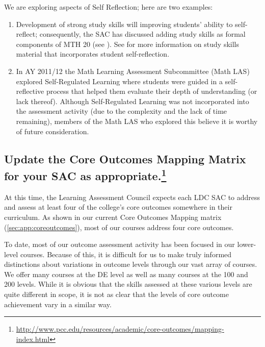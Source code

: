 \begin{description}
	We are exploring aspects of Self Reflection; here are two examples:
	\begin{enumerate}
		\item
		Development of strong study skills will improving students' ability to self-reflect; consequently,
		the SAC has discussed adding study skills as formal components
		of MTH 20 (see ).  See 
		for more information on study skills material that incorporates student
		self-reflection.
		\item
		In AY 2011/12 the Math Learning Assessment Subcommittee (Math LAS) explored
		Self-Regulated Learning where students were guided in a self-reflective
		process that helped them evaluate their depth of understanding (or lack
		thereof).  Although Self-Regulated Learning was not incorporated into the
		assessment activity (due to the complexity and the lack of time remaining),
		members of the Math LAS who explored this believe it is worthy of future
		consideration.
	\end{enumerate}
\end{description}

\subsection[Core outcomes mapping matrix]{Update the Core Outcomes Mapping Matrix for your SAC as
appropriate.\footnote{\url{http://www.pcc.edu/resources/academic/core-outcomes/mapping-index.html}}}
At this time, the Learning Assessment Council expects each LDC SAC to address and assess at least four of the college's core outcomes somewhere in their curriculum. As shown in our current Core Outcomes Mapping matrix (\vref{sec:app:coreoutcomes}), most of our courses address four core outcomes.  

To date, most of our outcome assessment activity has been focused in our
lower-level courses. Because of this, it is difficult for us to make truly
informed distinctions about variations in outcome levels through our vast array
of courses.  We offer many courses at the DE level as well as many courses at
the 100 and 200 levels.  While it is obvious that the skills assessed at these
various levels are quite different in scope, it is not as clear that the levels
of core outcome achievement vary in a similar way.


